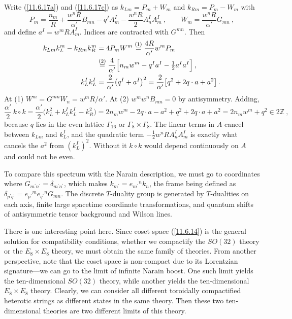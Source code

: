 \begin{tcolorbox}[breakable]
	\begin{remark}
		Write (\ref{11.6.17a}) and (\ref{11.6.17c}) as $k_{Lm}=P_{m}+W_{m}$ and $k_{Rm}=P_{m}-W_{m}$ with
		\begin{equation*}
			P_{m}=\frac{n_{m}}{R}+\frac{w^{n}R}{\alpha'}B_{mn}-q^{I}A^{I}_{m}-\frac{w^{n}R}{2}A^{I}_{n}A^{I}_{m}\:,\qquad W_{m}=\frac{w^{n}R}{\alpha'}G_{mn}\:,
		\end{equation*}
		and define $a^{I}=w^{m}RA^{I}_{m}$. Indices are contracted with $G^{mn}$. Then
		\begin{align*}
			k_{Lm}k_{L}^{m}-k_{Rm}k_{R}^{m}&=4P_{m}W^{m}\overset{(1)}{=}\frac{4R}{\alpha'}w^{m}P_{m}\\
			&\overset{(2)}{=}\frac{4}{\alpha'}\Bigl[n_{m}w^{m}-q^{I}a^{I}-\tfrac{1}{2}a^{I}a^{I}\Bigr]\:,\\
			k_{L}^{I}k_{L}^{I}&=\frac{2}{\alpha'}\bigl(q^{I}+a^{I}\bigr)^{2}=\frac{2}{\alpha'}\bigl[q^{2}+2q\cdot a+a^{2}\bigr]\:.
		\end{align*}
		At (1) $W^{m}=G^{mn}W_{n}=w^{m}R/\alpha'$. At (2) $w^{m}w^{n}B_{mn}=0$ by antisymmetry. Adding,
		\begin{equation*}
			\frac{\alpha'}{2}\,k\circ k=\frac{\alpha'}{2}\bigl(k_{L}^{2}+k^{I}_{L}k^{I}_{L}-k_{R}^{2}\bigr)
			=2n_{m}w^{m}-2q\cdot a-a^{2}+q^{2}+2q\cdot a+a^{2}=2n_{m}w^{m}+q^{2}\in2\mathds{Z}\:,
		\end{equation*}
		because $q$ lies in the even lattice $\Gamma_{16}$ or $\Gamma_{8}\times\Gamma_{8}$. The linear terms in $A$ cancel between $k_{Lm}$ and $k_{L}^{I}$, and the quadratic term $-\frac{1}{2}w^{n}RA^{I}_{n}A^{I}_{m}$ is exactly what cancels the $a^{2}$ from $(k_{L}^{I})^{2}$. Without it $k\circ k$ would depend continuously on $A$ and could not be even.
	\end{remark}
\end{tcolorbox}

To compare this spectrum with the Narain description, we must go to coordinates where $G_{m^{\prime}n^{\prime}}=\delta_{m^{\prime}n^{\prime}}$, which makes $k_{m^{\prime}}=e_{m^{\prime}}{}^{n}k_{n}$, the frame being defined as $\delta_{p^{\prime}q^{\prime}}=e_{p^{\prime}}{}^{m}e_{q^{\prime}}{}^{n}G_{mn}$. The discrete $T$-duality group is generated by $T$-dualities on each axis, finite large spacetime coordinate transformations, and quantum shifts of antisymmetric tensor background and Wilson lines.

There is one interesting point here. Since coset space (\ref{11.6.14}) is the general solution for compatibility conditions, whether we compactify the $SO(32)$ theory or the $E_{8}\times E_{8}$ theory, we must obtain the same family of theories. From another perspective, note that the coset space is non-compact due to its Lorentzian signature—we can go to the limit of infinite Narain boost. One such limit yields the ten-dimensional $SO(32)$ theory, while another yields the ten-dimensional $E_{8}\times E_{8}$ theory. Clearly, we can consider all different toroidally compactified heterotic strings as different states in the same theory. Then these two ten-dimensional theories are two different limits of this theory.

